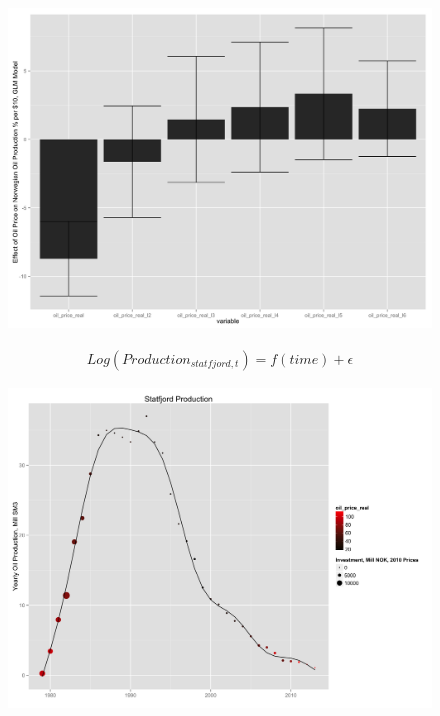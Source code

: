 \documentclass{beamer}
\begin{document}
\begin{frame}[plain]
	\begin{figure}
	\includegraphics[width=1\textwidth]{glm_coef_plot.png}
	\end{figure}
\end{frame}


\begin{frame}[plain]
	\begin{multline}
	\nonumber Log(Production_{statfjord,t})=f(time) + \epsilon
	\end{multline}
\end{frame}


\begin{frame}[plain]
	\begin{figure}
	\includegraphics[width=1\textwidth]{statfjord_gam.png}
	\end{figure}
\end{frame}
\end{document}
